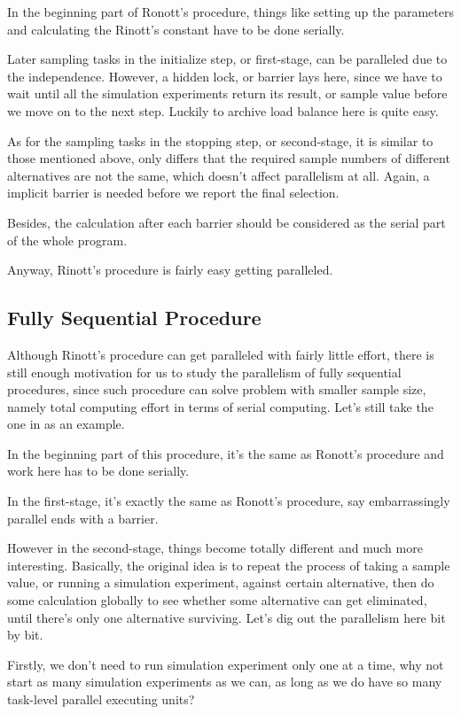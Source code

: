 \documentclass[12pt,a4]{report}
\begin{document}
In the beginning part of Ronott's procedure, things like setting up the parameters and calculating the Rinott's constant have to be done serially.

Later sampling tasks in the initialize step, or first-stage, can be paralleled due to the independence. However, a hidden lock, or barrier lays here, since we have to wait until all the simulation experiments return its result, or sample value before we move on to the next step. Luckily to archive load balance here is quite easy.

As for the sampling tasks in the stopping step, or second-stage, it is similar to those mentioned above, only differs that the required sample numbers of different alternatives are not the same, which doesn't affect parallelism at all. Again, a implicit barrier is needed before we report the final selection.

Besides, the calculation after each barrier should be considered as the serial part of the whole program.

Anyway, Rinott's procedure is fairly easy getting paralleled.

\subsection{Fully Sequential Procedure}

Although Rinott's procedure can get paralleled with fairly little effort, there is still enough motivation for us to study the parallelism of fully sequential procedures, since such procedure can solve problem with smaller sample size, namely total computing effort in terms of serial computing. Let's still take the one in \cite{ras-seq-jeff} as an example.

In the beginning part of this procedure, it's the same as Ronott's procedure and work here has to be done serially.

In the first-stage, it's exactly the same as Ronott's procedure, say embarrassingly parallel ends with a barrier.

However in the second-stage, things become totally different and much more interesting. Basically, the original idea is to repeat the process of taking a sample value, or running a simulation experiment, against certain alternative, then do some calculation globally to see whether some alternative can get eliminated, until there's only one alternative surviving. Let's dig out the parallelism here bit by bit.

Firstly, we don't need to run simulation experiment only one at a time, why not start as many simulation experiments as we can, as long as we do have so many task-level parallel executing units?
\end{document}
